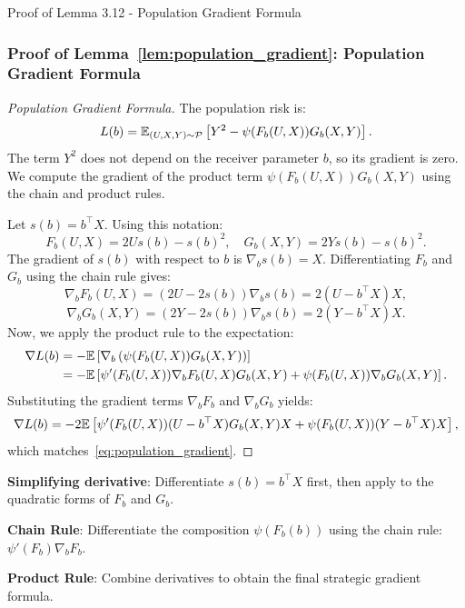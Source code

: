 \begin{sourceblock}{Proof of Lemma 3.12 - Population Gradient Formula}
\subsubsection*{Proof of Lemma~\ref{lem:population_gradient}: Population Gradient Formula}
\label{app:proof_population_gradient}
\begin{proof}[Population Gradient Formula]
The population risk is:
\begin{equation}
    L(b) = \mathbb{E}_{(U,X,Y) \sim \mathcal{P}}\left[ Y^2 - \psi(F_b(U, X)) G_b(X, Y) \right].
\end{equation}
The term $Y^2$ does not depend on the receiver parameter $b$, so its gradient is zero. We compute the gradient of the product term $\psi(F_b(U, X)) G_b(X, Y)$ using the chain and product rules.

Let $s(b) = b^\top X$. Using this notation:
\begin{equation}
    F_b(U, X) = 2Us(b) - s(b)^2, \quad G_b(X, Y) = 2Ys(b) - s(b)^2.
\end{equation}
The gradient of $s(b)$ with respect to $b$ is $\nabla_b s(b) = X$. 
Differentiating $F_b$ and $G_b$ using the chain rule gives:
\begin{equation}
    \nabla_b F_b(U, X) = (2U - 2s(b))\nabla_b s(b) = 2(U - b^\top X)X,
\end{equation}
\begin{equation}
    \nabla_b G_b(X, Y) = (2Y - 2s(b))\nabla_b s(b) = 2(Y - b^\top X)X.
\end{equation}
Now, we apply the product rule to the expectation:
\begin{align}
    \nabla L(b) &= -\mathbb{E}\left[ \nabla_b \left( \psi(F_b(U, X)) G_b(X, Y) \right) \right] \nonumber \\
    &= -\mathbb{E}\left[ \psi'(F_b(U, X))\nabla_b F_b(U, X) G_b(X, Y) + \psi(F_b(U, X)) \nabla_b G_b(X, Y) \right].
\end{align}
Substituting the gradient terms $\nabla_b F_b$ and $\nabla_b G_b$ yields:
\begin{equation}
    \nabla L(b) = -2 \mathbb{E}\left[ \psi'(F_b(U, X))(U - b^\top X) G_b(X, Y) X + \psi(F_b(U, X))(Y - b^\top X) X \right],
\end{equation}
which matches~\eqref{eq:population_gradient}.
\end{proof}
\end{sourceblock}

\begin{guideblock}
\item \textbf{Simplifying derivative}: Differentiate $s(b) = b^\top X$ first, then apply to the quadratic forms of $F_b$ and $G_b$.
\item \textbf{Chain Rule}: Differentiate the composition $\psi(F_b(b))$ using the chain rule: $\psi'(F_b) \nabla_b F_b$.
\item \textbf{Product Rule}: Combine derivatives to obtain the final strategic gradient formula.
\end{guideblock}


